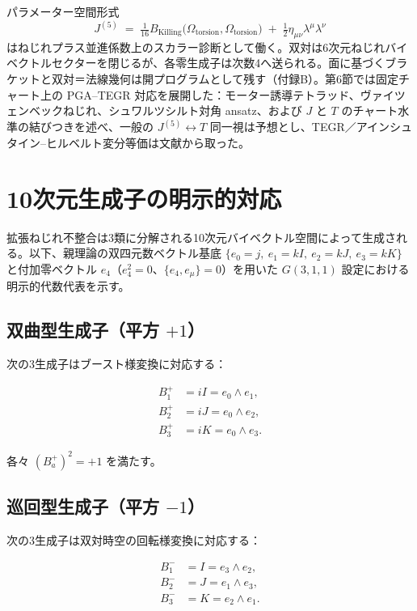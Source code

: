 \documentclass[dvipdfmx,11pt,a4paper]{article}
\theoremstyle{definition}
\theoremstyle{plain}
\theoremstyle{remark}
\begin{document}
パラメーター空間形式
\[
J^{(5)} \;=\; \tfrac{1}{16}B_{\text{Killing}}\!\bigl(\Omega_{\text{torsion}},\Omega_{\text{torsion}}\bigr) \;+\; \tfrac{1}{2}\eta_{\mu\nu}\lambda^{\mu}\lambda^{\nu}
\]
はねじれプラス並進係数上のスカラー診断として働く。双対は6次元ねじれバイベクトルセクターを閉じるが、各零生成子は次数4へ送られる。面に基づくブラケットと双対＝法線幾何は開プログラムとして残す（付録B）。第6節では固定チャート上の PGA--TEGR 対応を展開した：モーター誘導テトラッド、ヴァイツェンベックねじれ、シュワルツシルト対角 ansatz、および $J$ と $T$ のチャート水準の結びつきを述べ、一般の $J^{(5)}\leftrightarrow T$ 同一視は予想とし、TEGR／アインシュタイン--ヒルベルト変分等価は文献から取った。

\appendix

\section{10次元生成子の明示的対応}

拡張ねじれ不整合は3類に分解される10次元バイベクトル空間によって生成される。以下、親理論の双四元数ベクトル基底 $\{e_{0}=j,\ e_{1}=kI,\ e_{2}=kJ,\ e_{3}=kK\}$ と付加零ベクトル $e_{4}$（$e_{4}^{2}=0$、$\{e_{4},e_{\mu}\}=0$）を用いた $G(3,1,1)$ 設定における明示的代数代表を示す。

\subsection{双曲型生成子（平方 $+1$）}

次の3生成子はブースト様変換に対応する：

\begin{align*}
B_{1}^{+} &= iI = e_{0}\wedge e_{1}, \\
B_{2}^{+} &= iJ = e_{0}\wedge e_{2}, \\
B_{3}^{+} &= iK = e_{0}\wedge e_{3}.
\end{align*}

各々 $(B_{a}^{+})^{2} = +1$ を満たす。

\subsection{巡回型生成子（平方 $-1$）}

次の3生成子は双対時空の回転様変換に対応する：

\begin{align*}
B_{1}^{-} &= I = e_{3}\wedge e_{2}, \\
B_{2}^{-} &= J = e_{1}\wedge e_{3}, \\
B_{3}^{-} &= K = e_{2}\wedge e_{1}.
\end{align*}
\end{document}
